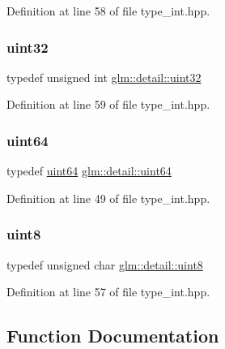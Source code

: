 Definition at line 58 of file type\+\_\+int.\+hpp.

\mbox{\label{namespaceglm_1_1detail_ade6cfbf377022aaa391af8cd50489222}} 
\subsubsection{\texorpdfstring{uint32}{uint32}}
{\footnotesize\ttfamily typedef unsigned int \mbox{\hyperlink{namespaceglm_1_1detail_ade6cfbf377022aaa391af8cd50489222}{glm\+::detail\+::uint32}}}



Definition at line 59 of file type\+\_\+int.\+hpp.

\mbox{\label{namespaceglm_1_1detail_adec4b19bf4982125e122db2fe03c5810}} 
\subsubsection{\texorpdfstring{uint64}{uint64}}
{\footnotesize\ttfamily typedef \mbox{\hyperlink{namespaceglm_1_1detail_adec4b19bf4982125e122db2fe03c5810}{uint64}} \mbox{\hyperlink{namespaceglm_1_1detail_adec4b19bf4982125e122db2fe03c5810}{glm\+::detail\+::uint64}}}



Definition at line 49 of file type\+\_\+int.\+hpp.

\mbox{\label{namespaceglm_1_1detail_aef2588f97d090cc19fbbe0c74fe17c8f}} 
\subsubsection{\texorpdfstring{uint8}{uint8}}
{\footnotesize\ttfamily typedef unsigned char \mbox{\hyperlink{namespaceglm_1_1detail_aef2588f97d090cc19fbbe0c74fe17c8f}{glm\+::detail\+::uint8}}}



Definition at line 57 of file type\+\_\+int.\+hpp.



\subsection{Function Documentation}
\mbox{\label{namespaceglm_1_1detail_a39644ee418ae41e3393d1cb6191e32a7}} 
